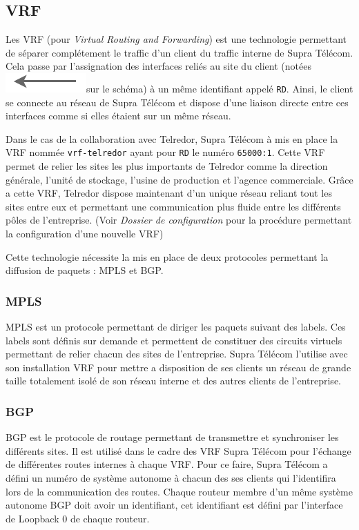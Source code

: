 \documentclass{article}
\newcommand{\tlr}{Telredor\xspace}
\newcommand{\spr}{Supra Télécom\xspace}
\newcommand{\flechevrf}{\includegraphics[scale=0.4]{img/lien-vrf-fleche}}
\begin{document}
\subsection{VRF}
\label{vrf}

Les VRF (pour \emph{Virtual Routing and Forwarding}) est une technologie permettant de séparer complétement le traffic d'un client du traffic interne de \spr.
Cela passe par l'assignation des interfaces reliés au site du client (notées \flechevrf sur le schéma) à un même identifiant appelé \texttt{RD}.
Ainsi, le client se connecte au réseau de \spr et dispose d'une liaison directe entre ces interfaces comme si elles étaient sur un même réseau.

Dans le cas de la collaboration avec \tlr, \spr à mis en place la VRF nommée \texttt{vrf-telredor} ayant pour \texttt{RD} le numéro \texttt{65000:1}.
Cette VRF permet de relier les sites les plus importants de \tlr comme la direction générale, l'unité de stockage, l'usine de production et l'agence commerciale.
Grâce a cette VRF, \tlr dispose maintenant d'un unique réseau reliant tout les sites entre eux et permettant une communication plus fluide entre les différents pôles de l'entreprise. (Voir \emph{Dossier de configuration} pour la procédure permettant la configuration d'une nouvelle VRF)

Cette technologie nécessite la mis en place de deux protocoles permettant la diffusion de paquets : MPLS et BGP.

\subsubsection{MPLS}

MPLS est un protocole permettant de diriger les paquets suivant des labels.
Ces labels sont définis sur demande et permettent de constituer des circuits virtuels permettant de relier chacun des sites de l'entreprise.
\spr l'utilise avec son installation VRF pour mettre a disposition de ses clients un réseau de grande taille totalement isolé de son réseau interne et des autres clients de l'entreprise.

\subsubsection{BGP}

BGP est le protocole de routage permettant de transmettre et synchroniser les différents sites.
Il est utilisé dans le cadre des VRF \spr pour l'échange de différentes routes internes à chaque VRF.
Pour ce faire, \spr a défini un numéro de système autonome à chacun des ses clients qui l'identifira lors de la communication des routes.
Chaque routeur membre d'un même système autonome BGP doit avoir un identifiant, cet identifiant est défini par l'interface de Loopback 0 de chaque routeur.
\end{document}
